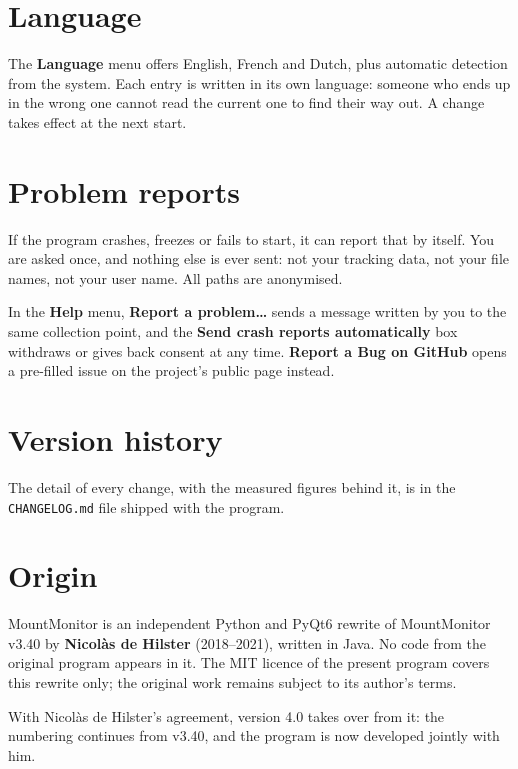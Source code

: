 \section{Language}

The \textbf{Language} menu offers English, French and Dutch, plus automatic
detection from the system. Each entry is written in its own language: someone
who ends up in the wrong one cannot read the current one to find their way out.
A change takes effect at the next start.

\section{Problem reports}

If the program crashes, freezes or fails to start, it can report that by
itself. You are asked once, and nothing else is ever sent: not your tracking
data, not your file names, not your user name. All paths are anonymised.

In the \textbf{Help} menu, \textbf{Report a problem\ldots} sends a message
written by you to the same collection point, and the \textbf{Send crash
reports automatically} box withdraws or gives back consent at any time.
\textbf{Report a Bug on GitHub} opens a pre-filled issue on the project's
public page instead.

\section{Version history}

The detail of every change, with the measured figures behind it, is in the
\texttt{CHANGELOG.md} file shipped with the program.

\section{Origin}

MountMonitor is an independent Python and PyQt6 rewrite of MountMonitor v3.40
by \textbf{Nicolàs de Hilster} (2018--2021), written in Java. No code from the
original program appears in it. The MIT licence of the present program covers
this rewrite only; the original work remains subject to its author's terms.

With Nicolàs de Hilster's agreement, version 4.0 takes over from it: the
numbering continues from v3.40, and the program is now developed jointly
with him.
